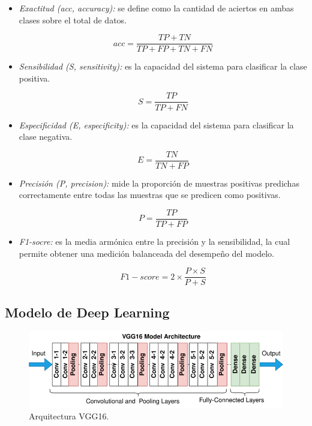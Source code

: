 \documentclass[10pt, a4paper]{article}
\begin{document}
\begin{itemize}
    \item \textit{Exactitud (acc, accuracy):} se define como la cantidad de aciertos en ambas clases sobre el total de datos.

    \begin{equation}
        acc = \frac{TP + TN}{TP + FP + TN + FN}
    \end{equation}

    \item \textit{Sensibilidad (S, sensitivity):} es la capacidad del sistema para clasificar la clase positiva.
    
    \begin{equation}
        S = \frac{TP}{TP+FN}
    \end{equation}

    \item \textit{Especificidad (E, especificity):} es la capacidad del sistema para clasificar la clase negativa.
    
    \begin{equation}
        E = \frac{TN}{TN+FP}
    \end{equation}

    \item \textit{Precisión (P, precision):} mide la proporción de muestras positivas predichas correctamente entre todas las muestras que se predicen como positivas.

    \begin{equation}
        P = \frac{TP}{TP+FP}
    \end{equation}

    \item \textit{F1-socre:} es la media armónica entre la precisión y la sensibilidad, la cual permite obtener una medición balanceada del desempeño del modelo.

    \begin{equation}
        F1-score = 2 \times \frac{P \times S}{P+S}
    \end{equation}
    
\end{itemize}

\subsection*{Modelo de Deep Learning}

\begin{figure}[h!!]
    \centering
    \includegraphics[width=1\textwidth]{images/VGG16.png}
    \caption{Arquitectura VGG16.}
    \label{fig:vgg}
\end{figure}
\end{document}
